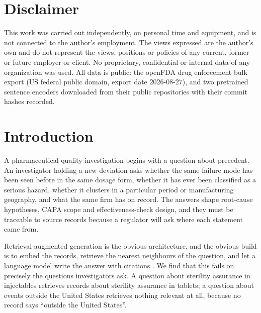\documentclass[runningheads]{llncs}
\begin{document}
\section*{Disclaimer}
This work was carried out independently, on personal time and equipment, and is not connected to the author's employment. The views expressed are the author's own and do not represent the views, positions or policies of any current, former or future employer or client. No proprietary, confidential or internal data of any organization was used. All data is public: the openFDA drug enforcement bulk export (US federal public domain, export date 2026-08-27), and two pretrained sentence encoders downloaded from their public repositories with their commit hashes recorded.


\section{Introduction}
A pharmaceutical quality investigation begins with a question about precedent. An investigator holding a new deviation asks whether the same failure mode has been seen before in the same dosage form, whether it has ever been classified as a serious hazard, whether it clusters in a particular period or manufacturing geography, and what the same firm has on record. The answers shape root-cause hypotheses, CAPA scope and effectiveness-check design, and they must be traceable to source records because a regulator will ask where each statement came from.

Retrieval-augmented generation \cite{lewis2020rag} is the obvious architecture, and the obvious build is to embed the records, retrieve the nearest neighbours of the question, and let a language model write the answer with citations \cite{gao2023alce}. We find that this fails on precisely the questions investigators ask. A question about sterility assurance in injectables retrieves records about sterility assurance in tablets; a question about events outside the United States retrieves nothing relevant at all, because no record says ``outside the United States''.
\end{document}
